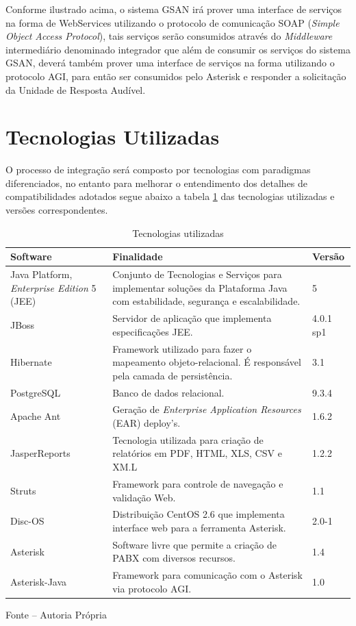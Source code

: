 Conforme ilustrado acima, o sistema GSAN irá prover uma interface de serviços na forma de WebServices utilizando o protocolo de comunicação SOAP (\textit{Simple Object Access Protocol}), tais serviços serão consumidos através do \textit{Middleware} intermediário denominado integrador que além de consumir os serviços do sistema GSAN, deverá também prover uma interface de serviços na forma utilizando o protocolo AGI, para então ser consumidos pelo Asterisk e responder a solicitação da Unidade de Resposta Audível.


\section{Tecnologias Utilizadas}
O processo de integração será composto por tecnologias com paradigmas diferenciados, no entanto para melhorar o entendimento dos detalhes de compatibilidades adotados segue abaixo a tabela \ref{tabela:tecnologiasUtilizadas}
	 das tecnologias utilizadas e versões correspondentes.


\begin{table}[H]
	\center
	\footnotesize
	\begin{tabular}{|p{4cm}|p{7cm}|p{2cm}|}
		\hline
		\textbf{Software} & \textbf{Finalidade} & \textbf{Versão} \\
		\hline
		Java Platform, \textit{Enterprise Edition} 5 (JEE) & Conjunto de Tecnologias e Serviços para implementar soluções da Plataforma Java com estabilidade, segurança e escalabilidade. & 5 \\
		\hline
		JBoss & Servidor de aplicação que implementa especificações JEE. & 4.0.1 sp1 \\
		\hline
		Hibernate & Framework utilizado para fazer o mapeamento objeto-relacional. É responsável pela camada de persistência. & 3.1 \\
		\hline
		PostgreSQL & Banco de dados relacional. & 9.3.4 \\
		\hline
		Apache Ant & Geração de \textit{Enterprise Application Resources} (EAR) deploy’s. & 1.6.2 \\
		\hline
		JasperReports & Tecnologia utilizada para criação de relatórios em PDF, HTML, XLS, CSV e XM.L & 1.2.2 \\
		\hline
		Struts & Framework para controle de navegação e validação Web. & 1.1	 \\
		\hline
		Disc-OS & Distribuição CentOS 2.6 que implementa interface web para a ferramenta Asterisk. & 2.0-1 \\
		\hline
		Asterisk & Software livre que permite a criação de PABX com diversos recursos. & 1.4 \\		
		\hline
		Asterisk-Java & Framework para comunicação com o Asterisk via protocolo AGI. & 1.0 \\	
		\hline			
	\end{tabular}
	\caption{Tecnologias utilizadas}
	\label{tabela:tecnologiasUtilizadas}
	Fonte – Autoria Própria
\end{table}



